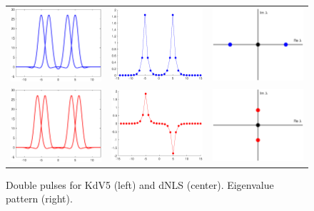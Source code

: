 \documentclass[12pt,reqno,oneside]{amsart}
\theoremstyle{definition}
\theoremstyle{remark}
\begin{document}
\begin{figure}
\centering
\begin{tabular}{ccc}
\includegraphics[width=4cm]{images/dp02.eps} &
\includegraphics[width=4cm]{images/dnls2unstable.eps} &
\includegraphics[width=4cm]{images/unstableeigpattern.eps} \\
\includegraphics[width=4cm]{images/dp13.eps} &
\includegraphics[width=4cm]{images/dnls2stable.eps} &
\includegraphics[width=4cm]{images/stableeigpattern.eps} 
\end{tabular}
\caption{Double pulses for KdV5 (left) and dNLS (center). Eigenvalue pattern (right).}
\label{fig:eigpatterns}
\end{figure}
\end{document}
